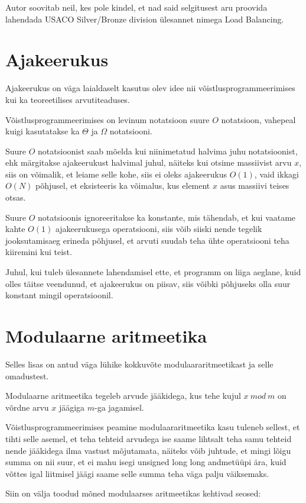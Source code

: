 \documentclass{trkut}
\begin{document}
\begin{appendices}
    Autor soovitab neil, kes pole kindel, et nad said selgitusest aru proovida lahendada USACO Silver/Bronze division ülesannet nimega Load Balancing\parencite{load}.

\chapter{Ajakeerukus}\label{lisa9}
    \tiny
    \normalsize
Ajakeerukus on väga laialdaselt kasutus olev idee nii võistlusprogrammeerimises kui ka teoreetilises arvutiteaduses.

Võistlusprogrammeerimises on levinum notatsioon suure $O$ notatsioon, vahepeal kuigi kasutatakse ka $\Theta$ ja $\Omega$ notatsiooni.

Suure $O$ notatsioonist saab mõelda kui niinimetatud halvima juhu notatsioonist, ehk märgitakse ajakeerukust halvimal juhul, näiteks kui otsime massiivist arvu $x$, siis on võimalik, et leiame selle kohe, siis ei oleks ajakeerukus $O(1)$, vaid ikkagi $O(N)$ põhjusel, et eksisteeris ka võimalus, kus element $x$ asus massiivi teises otsas.

Suure $O$ notatsioonis ignoreeritakse ka konstante, mis tähendab, et kui vaatame kahte $O(1)$ ajakeerukusega operatsiooni, siis võib siiski nende tegelik jooksutamisaeg erineda põhjusel, et arvuti suudab teha ühte operatsiooni teha kiiremini kui teist.

Juhul, kui tuleb ülesannete lahendamisel ette, et programm on liiga aeglane, kuid olles täitse veendunud, et ajakeerukus on piisav, siis võibki põhjuseks olla suur konstant mingil operatsioonil.
\chapter{Modulaarne aritmeetika}\label{lisa10}
    \tiny
    \normalsize
Selles lisas on antud väga lühike kokkuvõte modulaararitmeetikast ja selle omadustest.

Modulaarne aritmeetika tegeleb arvude jääkidega, kus tehe kujul $x\ mod\ m$  on võrdne arvu $x$ jäägiga $m$-ga jagamisel.

Võistlusprogrammeerimises peamine modulaararitmeetika kasu tuleneb sellest, et tihti selle asemel, et teha tehteid arvudega ise saame lihtsalt teha samu tehteid nende jääkidega ilma vastust mõjutamata, näiteks võib juhtude, et mingi lõigu summa on nii suur, et ei mahu isegi unsigned long long andmetüüpi ära, kuid võttes igal liitmisel jäägi saame selle summa teha väga palju väiksemaks.

Siin on välja toodud mõned modulaarses aritmeetikas kehtivad seosed:


\end{appendices}
\end{document}
